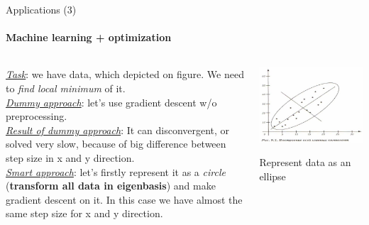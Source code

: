 \documentclass[aspectratio=169]{beamer}
\begin{document}
\begin{frame}[t]{Applications (3)}
    \framesubtitle{Machine learning + optimization}
    \vspace{-0.5cm}
        \begin{columns}[T,onlytextwidth]
            \begin{column}{0.60\textwidth}
                \underline{\textit{Task}}: we have data, which depicted on figure. We need to \textit{find local minimum} of it. \\
\underline{\textit{Dummy approach}}: let's use gradient descent w/o preprocessing. \\
\underline{\textit{Result of dummy approach}}: It can disconvergent, or solved very slow, because of  big difference between step size in x and y direction. \\
\underline{\textit{Smart approach}}: let's firstly represent it as a \textit{circle} (\textbf{transform all data in eigenbasis}) and make gradient descent on it. In this case we have almost the same step size for x and y direction.
            \end{column}
            \begin{column}{0.35\textwidth}
                \vspace{-0.5cm}
                    \begin{minipage}{0.58\textwidth}
                        \centering\includegraphics[width=\textwidth,keepaspectratio]{data_ellipse.jpg}
                    \end{minipage}\hfill
                    \begin{minipage}{0.40\textwidth}
                        Represent data as an ellipse

\end{minipage}
\end{column}
\end{columns}
\end{frame}
\end{document}
